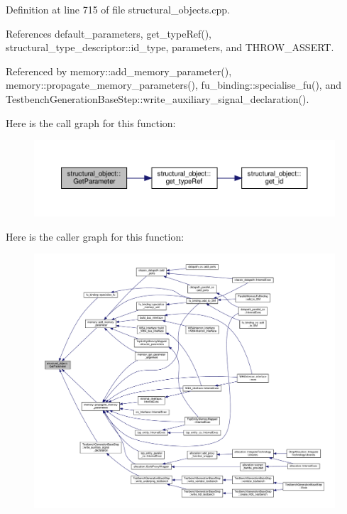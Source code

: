 Definition at line 715 of file structural\+\_\+objects.\+cpp.



References default\+\_\+parameters, get\+\_\+type\+Ref(), structural\+\_\+type\+\_\+descriptor\+::id\+\_\+type, parameters, and T\+H\+R\+O\+W\+\_\+\+A\+S\+S\+E\+RT.



Referenced by memory\+::add\+\_\+memory\+\_\+parameter(), memory\+::propagate\+\_\+memory\+\_\+parameters(), fu\+\_\+binding\+::specialise\+\_\+fu(), and Testbench\+Generation\+Base\+Step\+::write\+\_\+auxiliary\+\_\+signal\+\_\+declaration().

Here is the call graph for this function\+:
\nopagebreak
\begin{figure}[H]
\begin{center}
\leavevmode
\includegraphics[width=350pt]{d8/da3/classstructural__object_a34b15e206f9c2911854a5fc785de001d_cgraph}
\end{center}
\end{figure}
Here is the caller graph for this function\+:
\nopagebreak
\begin{figure}[H]
\begin{center}
\leavevmode
\includegraphics[width=350pt]{d8/da3/classstructural__object_a34b15e206f9c2911854a5fc785de001d_icgraph}
\end{center}
\end{figure}
\mbox{\label{classstructural__object_a3319b409440f03f4e953b7c48f9aea25}} 
